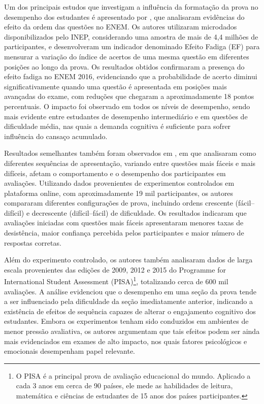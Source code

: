 \documentclass[a4paper,10pt, twocolumn]{article}
\begin{document}
Um dos principais estudos que investigam a influência da formatação da prova no desempenho dos estudantes é apresentado por \textcite{Barichello2022}, que analisaram evidências do efeito da ordem das questões no ENEM. Os autores utilizaram microdados disponibilizados pelo INEP, considerando uma amostra de mais de 4,4 milhões de participantes, e desenvolveram um indicador denominado Efeito Fadiga (EF) para mensurar a variação do índice de acertos de uma mesma questão em diferentes posições ao longo da prova. Os resultados obtidos confirmaram a presença do efeito fadiga no ENEM 2016, evidenciando que a probabilidade de acerto diminui significativamente quando uma questão é apresentada em posições mais avançadas do exame, com reduções que chegaram a aproximadamente 18 pontos percentuais. O impacto foi observado em todos os níveis de desempenho, sendo mais evidente entre estudantes de desempenho intermediário e em questões de dificuldade média, nas quais a demanda cognitiva é suficiente para sofrer influência do cansaço acumulado. 

Resultados semelhantes também foram observados em \textcite{Anaya2023}, em que analisaram como diferentes sequências de apresentação, variando entre questões mais fáceis e mais difíceis, afetam o comportamento e o desempenho dos participantes em avaliações. Utilizando dados provenientes de experimentos controlados em plataforma online, com aproximadamente 19 mil participantes, os autores compararam diferentes configurações de prova, incluindo ordens crescente (fácil–difícil) e decrescente (difícil–fácil) de dificuldade. Os resultados indicaram que avaliações iniciadas com questões mais fáceis apresentaram menores taxas de desistência, maior confiança percebida pelos participantes e maior número de respostas corretas.

Além do experimento controlado, os autores também analisaram dados de larga escala provenientes das edições de 2009, 2012 e 2015 do Programme for International Student Assessment (PISA)\footnote{O PISA é a principal prova de avaliação educacional do mundo. Aplicado a cada 3 anos em cerca de 90 países, ele mede as habilidades de leitura, matemática e ciências de estudantes de 15 anos dos países participantes.}, totalizando cerca de 600 mil avaliações. A análise evidenciou que o desempenho em uma seção da prova tende a ser influenciado pela dificuldade da seção imediatamente anterior, indicando a existência de efeitos de sequência capazes de alterar o engajamento cognitivo dos estudantes. Embora os experimentos tenham sido conduzidos em ambientes de menor pressão avaliativa, os autores argumentam que tais efeitos podem ser ainda mais evidenciados em exames de alto impacto, nos quais fatores psicológicos e emocionais desempenham papel relevante.
\end{document}
